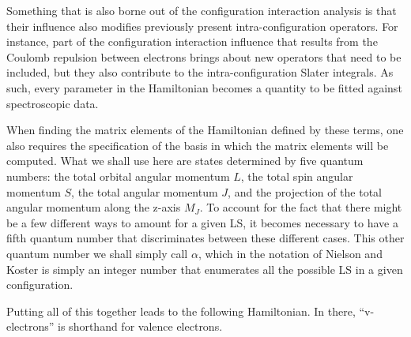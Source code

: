 \documentclass{article}
\begin{document}
Something that is also borne out of the configuration interaction analysis is that their influence also modifies previously present intra-configuration operators. For instance, part of the configuration interaction influence that results from the Coulomb repulsion between electrons brings about new operators that need to be included, but they also contribute to the intra-configuration Slater integrals. As such, every parameter in the Hamiltonian becomes a quantity to be fitted against spectroscopic data.

When finding the matrix elements of the Hamiltonian defined by these terms, one also requires the specification of the basis in which the matrix elements will be computed. What we shall use here are states determined by five quantum numbers: the total orbital angular momentum $L$, the total spin angular momentum $S$, the total angular momentum $J$, and the projection of the total angular momentum along the z-axis $M_J$. To account for the fact that there might be a few different ways to amount for a given LS, it becomes necessary to have a fifth quantum number that discriminates between these different cases. This other quantum number we shall simply call $\alpha$, which in the notation of Nielson and Koster is simply an integer number that enumerates all the possible LS in a given \fn configuration.

Putting all of this together leads to the following Hamiltonian. In there, ``v-electrons'' is shorthand for valence electrons.
\end{document}
